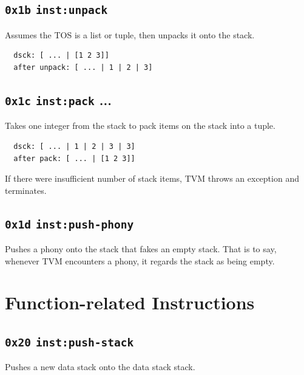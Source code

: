 \documentclass{report}
\newcommand{\inst}[1] {\texttt{inst:#1}}
\begin{document}
\subsection{\texttt{0x1b} \inst{unpack} }

Assumes the TOS is a list or tuple, then unpacks it onto the stack.

\begin{mdframed}[style=example]
\begin{verbatim}
  dsck: [ ... | [1 2 3]]
  after unpack: [ ... | 1 | 2 | 3]
\end{verbatim}
\end{mdframed}
\subsection{\texttt{0x1c} \inst{pack}    ... }

Takes one integer  from the stack to pack  items on the stack into a tuple.

\begin{mdframed}[style=example]
\begin{verbatim}
  dsck: [ ... | 1 | 2 | 3 | 3]
  after pack: [ ... | [1 2 3]]
\end{verbatim}
\end{mdframed}

\begin{mdframed}[style=hint]
  If there were insufficient number of stack items, TVM throws an
  exception and terminates.
\end{mdframed}

\subsection{\texttt{0x1d} \inst{push-phony}}

Pushes a phony onto the stack that fakes an empty stack. That is to say, whenever TVM encounters a phony, it regards the stack as being empty.

\section{Function-related Instructions}

\subsection{\texttt{0x20} \inst{push-stack}}

Pushes a new data stack onto the data stack stack.
\end{document}
